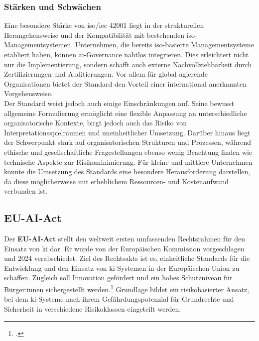 \subsubsection{Stärken und Schwächen}
\label{subsubsec:iso_stärken_schwächen}
Eine besondere Stärke von \ac{iso}/\ac{iec} 42001 liegt in der strukturellen Herangehensweise und der Kompatibilität mit bestehenden \ac{iso}-Managementsystemen.
Unternehmen, die bereits \ac{iso}-basierte Managementsysteme etabliert haben, können \ac{ai}-Governance nahtlos integrieren.
Dies erleichtert nicht nur die Implementierung, sondern schafft auch externe Nachvollziehbarkeit durch Zertifizierungen und Auditierungen.
Vor allem für global agierende Organisationen bietet der Standard den Vorteil einer international anerkannten Vorgehensweise.
\\
Der Standard weist jedoch auch einige Einschränkungen auf.
Seine bewusst allgemeine Formulierung ermöglicht eine flexible Anpassung an unterschiedliche organisatorische Kontexte, birgt jedoch auch das Risiko von Interpretationsspielräumen und uneinheitlicher Umsetzung.
Darüber hinaus liegt der Schwerpunkt stark auf organisatorischen Strukturen und Prozessen, während ethische und gesellschaftliche Fragestellungen ebenso wenig Beachtung finden wie technische Aspekte zur Risikominimierung.
Für kleine und mittlere Unternehmen könnte die Umsetzung des Standards eine besondere Herausforderung darstellen, da diese möglicherweise mit erheblichem Ressourcen- und Kostenaufwand verbunden ist.


\subsection{EU-AI-Act}
\label{subsec:eu_ai_act}
Der \textbf{EU-AI-Act} stellt den weltweit ersten umfassenden Rechtsrahmen für den Einsatz von \acf{ki} dar.
Er wurde von der Europäischen Kommission vorgeschlagen und 2024 verabschiedet.
Ziel des Rechtsakts ist es, einheitliche Standards für die Entwicklung und den Einsatz von \acf{ki}-Systemen in der Europäischen Union zu schaffen.
Zugleich soll Innovation gefördert und ein hohes Schutzniveau für Bürger:innen sichergestellt werden.\footcite[1-3]{kimAIGovernanceContext2025}
Grundlage bildet ein risikobasierter Ansatz, bei dem \ac{ki}-Systeme nach ihrem Gefährdungspotenzial für Grundrechte und Sicherheit in verschiedene Risikoklassen eingeteilt werden.

